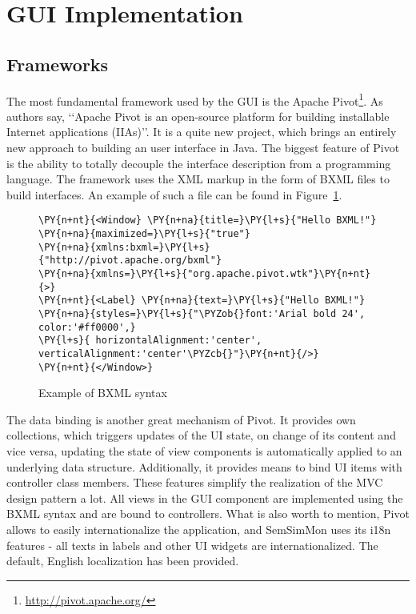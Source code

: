 \section{GUI Implementation}
\subsection{Frameworks}

The most fundamental framework used by the GUI is the Apache Pivot\footnote{\url{http://pivot.apache.org/}}. As authors say, \lq\lq{}Apache Pivot is an open-source platform for building installable Internet applications (IIAs)\rq\rq{}. It is a quite new project, which brings an entirely new approach to building an user interface in Java. The biggest feature of Pivot is the ability to totally decouple the interface description from a programming language. The framework uses the XML markup in the form of BXML files to build interfaces. An example of such a file can be found in Figure~\ref{fig:bxml_example}.

\begin{figure}[ht]
\centering
\begin{Verbatim}[commandchars=\\\{\},frame=single,framerule=0.2pt] 
\PY{n+nt}{<Window} \PY{n+na}{title=}\PY{l+s}{"Hello BXML!"} \PY{n+na}{maximized=}\PY{l+s}{"true"} 
\PY{n+na}{xmlns:bxml=}\PY{l+s}{"http://pivot.apache.org/bxml"} 
\PY{n+na}{xmlns=}\PY{l+s}{"org.apache.pivot.wtk"}\PY{n+nt}{>} 
\PY{n+nt}{<Label} \PY{n+na}{text=}\PY{l+s}{"Hello BXML!"} 
\PY{n+na}{styles=}\PY{l+s}{"\PYZob{}font:'Arial bold 24', color:'#ff0000',} 
\PY{l+s}{ horizontalAlignment:'center', verticalAlignment:'center'\PYZcb{}"}\PY{n+nt}{/>} 
\PY{n+nt}{</Window>} 
\end{Verbatim} 
\caption{Example of BXML syntax}
\label{fig:bxml_example}
\end{figure}

The data binding is another great mechanism of Pivot. It provides own collections, which triggers updates of the UI state, on change of its content and vice versa, updating the state of view components is automatically applied to an underlying data structure. Additionally, it provides means to bind UI items with controller class members. These features simplify the realization of the MVC design pattern a lot. All views in the GUI component are implemented using the BXML syntax and are bound to controllers. What is also worth to mention, Pivot allows to easily internationalize the application, and SemSimMon uses its i18n features - all texts in labels and other UI widgets are internationalized. The default, English localization has been provided.

